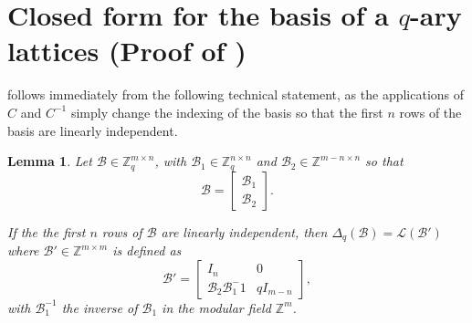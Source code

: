 \documentclass[11pt]{article}
\theoremstyle{definition}
\theoremstyle{plain}
\newtheorem{lemma}[definition]{Lemma}
\theoremstyle{remark}
\newcommand{\LL}{\mathcal{L}}
\newcommand{\cB}{\mathcal{B}}
\newcommand{\bZ}{\mathbb{Z}}
\begin{document}
\newpage
\section{Closed form for the basis of a $q$-ary lattices (Proof of )}\label{app:q-ary}

 follows immediately from the following technical statement, as the applications of $C$ and $C^{-1}$ simply change the indexing of the basis so that the first $n$ rows of the basis are linearly independent.

\begin{lemma}\label{$q$-ary lattice basis}
Let $\cB \in \bZ_q^{m \times n}$, with $\cB_1 \in \bZ_q^{n \times n}$ and $\cB_2 \in \bZ^{m - n \times n}$ so that
$$\cB = \begin{bmatrix}
\cB_1 \\
\cB_2
\end{bmatrix}.$$

If the the first $n$ rows of $\cB$ are linearly independent, then  $\Delta_q(\cB) = \LL(\cB')$ where $\cB' \in \bZ^{m \times m}$ is defined as 
$$\cB' = \begin{bmatrix}
I_n & 0\\
\cB_2\cB_1^-1 & qI_{m-n}
\end{bmatrix},$$
with $\cB_1^{-1}$ the inverse of $\cB_1$ in the modular field $\bZ^{m}$.
\end{lemma}

\end{document}

